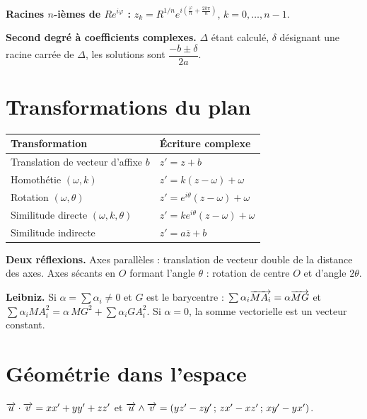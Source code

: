 \noindent
\textbf{Racines $n$-ièmes de $Re^{i\varphi}$ :}
$z_{k} = R^{1/n}e^{i\left(\frac{\varphi}{n}+\frac{2k\pi}{n}\right)}$,
$k = 0,\dots,n-1$.

\smallskip
\noindent
\textbf{Second degré à coefficients complexes.} $\Delta$ étant calculé,
$\delta$ désignant une racine carrée de $\Delta$, les solutions sont
$\dfrac{-b \pm \delta}{2a}$.

\section*{Transformations du plan}

\begin{center}
\setlength{\tabcolsep}{10pt}
\renewcommand{\arraystretch}{1.5}
\begin{tabular}{@{}ll@{}}
\toprule
Transformation & Écriture complexe \\
\midrule
Translation de vecteur d'affixe $b$ & $z' = z+b$ \\
Homothétie $(\omega,k)$ & $z' = k(z-\omega)+\omega$ \\
Rotation $(\omega,\theta)$ &
  $z' = e^{i\theta}(z-\omega)+\omega$ \\
Similitude directe $(\omega,k,\theta)$ &
  $z' = ke^{i\theta}(z-\omega)+\omega$ \\
Similitude indirecte & $z' = a\overline z+b$ \\
\bottomrule
\end{tabular}
\end{center}

\noindent
\textbf{Deux réflexions.} Axes parallèles : translation de vecteur double de
la distance des axes. Axes sécants en $O$ formant l'angle $\theta$ :
rotation de centre $O$ et d'angle $2\theta$.

\smallskip
\noindent
\textbf{Leibniz.} Si $\alpha = \sum \alpha_{i} \neq 0$ et $G$ est le
barycentre :
$\sum \alpha_{i}\overrightarrow{MA_{i}} = \alpha\overrightarrow{MG}$ et
$\sum \alpha_{i}MA_{i}^{2} = \alpha\,MG^{2}+\sum \alpha_{i}GA_{i}^{2}$.
Si $\alpha = 0$, la somme vectorielle est un vecteur constant.

\section*{Géométrie dans l'espace}

\noindent
$\overrightarrow{u} \cdot \overrightarrow{v} = xx'+yy'+zz'$ \quad et \quad
$\overrightarrow{u} \wedge \overrightarrow{v} = \left(yz'-zy'\,;\,zx'-xz'\,;\,xy'-yx'\right)$.


